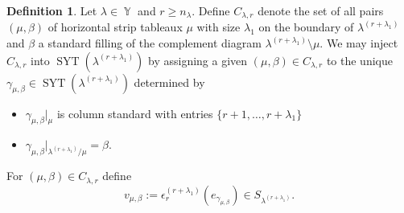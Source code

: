 \documentclass[12pt,reqno]{amsart}
\theoremstyle{definition}
\newtheorem{defn}[thm]{Definition}
\DeclareMathOperator{\SYT}{\mathrm{SYT}}
\DeclareMathOperator{\Par}{\mathbb{Y}}
\begin{document}
\begin{defn}\label{defn partial inv basis}
    Let $\lambda \in \Par$ and $r \geq n_{\lambda}$. Define $C_{\lambda,r}$ denote the set of all pairs $(\mu,\beta)$ of horizontal strip tableaux $\mu$ with size $\lambda_1$ on the boundary of $\lambda^{(r+\lambda_1)}$ and $\beta$ a standard filling of the complement diagram $\lambda^{(r+\lambda_1)} \setminus \mu$. We may inject $C_{\lambda,r}$ into $\SYT(\lambda^{(r+\lambda_1)})$ by assigning a given $(\mu,\beta) \in C_{\lambda,r}$ to the unique $\gamma_{\mu,\beta} \in \SYT(\lambda^{(r+\lambda_1)})$ determined by \begin{itemize}
        \item $\gamma_{\mu,\beta} |_{\mu}$ is column standard with entries $\{r+1,\dots,r+\lambda_1\}$
        \item $\gamma_{\mu,\beta}|_{\lambda^{(r+\lambda_1)}/ \mu} = \beta.$  
    \end{itemize}
    For $(\mu,\beta) \in C_{\lambda,r}$ define 
    $$v_{\mu,\beta}:= \epsilon_{r}^{(r+\lambda_1)}(e_{\gamma_{\mu,\beta}}) \in S_{\lambda^{(r+\lambda_1)}}.$$
\end{defn}
\end{document}

